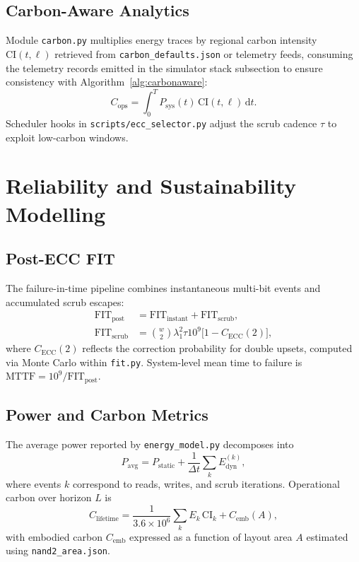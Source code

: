 \documentclass[conference]{IEEEtran}
\begin{document}
\subsection{Carbon-Aware Analytics}
Module \texttt{carbon.py} multiplies energy traces by regional carbon intensity $\text{CI}(t,\ell)$ retrieved from \texttt{carbon\_defaults.json} or telemetry feeds, consuming the telemetry records emitted in the simulator stack subsection to ensure consistency with Algorithm~\ref{alg:carbonaware}:
\begin{equation}
C_{\text{ops}} = \int_{0}^{T} P_{\text{sys}}(t)\,\text{CI}(t,\ell)\,\mathrm{d}t.
\end{equation}
Scheduler hooks in \texttt{scripts/ecc\_selector.py} adjust the scrub cadence $\tau$ to exploit low-carbon windows.

\section{Reliability and Sustainability Modelling}
\label{sec:reliability}
\subsection{Post-ECC FIT}
The failure-in-time pipeline combines instantaneous multi-bit events and accumulated scrub escapes:
\begin{align}
\text{FIT}_{\text{post}} &= \text{FIT}_{\text{instant}} + \text{FIT}_{\text{scrub}},\\
\text{FIT}_{\text{scrub}} &= \binom{w}{2} \lambda_{1}^{2} \tau 10^{9} \bigl[1-C_{\text{ECC}}(2)\bigr],
\end{align}
where $C_{\text{ECC}}(2)$ reflects the correction probability for double upsets, computed via Monte Carlo within \texttt{fit.py}.
System-level mean time to failure is $\text{MTTF}=10^{9}/\text{FIT}_{\text{post}}$.

\subsection{Power and Carbon Metrics}
The average power reported by \texttt{energy\_model.py} decomposes into
\begin{equation}
P_{\text{avg}} = P_{\text{static}} + \frac{1}{\Delta t} \sum_{k} E_{\text{dyn}}^{(k)},
\end{equation}
where events $k$ correspond to reads, writes, and scrub iterations.
Operational carbon over horizon $L$ is
\begin{equation}
C_{\text{lifetime}} = \frac{1}{3.6\times10^{6}} \sum_{k} E_{k}\,\text{CI}_{k} + C_{\text{emb}}(A),
\end{equation}
with embodied carbon $C_{\text{emb}}$ expressed as a function of layout area $A$ estimated using \texttt{nand2\_area.json}.
\end{document}
